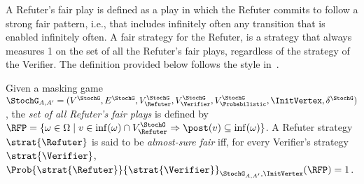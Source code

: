 



A Refuter's fair play is defined as a play in which the Refuter commits to follow a strong fair pattern, i.e., that includes infinitely often any transition that is enabled infinitely often.  A fair strategy for the Refuter, is a strategy that always measures 1 on the set of all the Refuter's fair plays, regardless of the strategy of the Verifier.  The definition provided below follows the style in~\cite{DBLP:journals/dc/BaierK98,BaierK08,DBLP:journals/corr/abs-2112-09811}.



%
\begin{definition}
  Given a masking game
  $\StochG_{A,A'} = (V^\StochG, E^\StochG, V^\StochG_\Refuter, V^\StochG_\Verifier, V^\StochG_\Probabilistic, \InitVertex, \delta^\StochG)$,
  the \emph{set of all Refuter's fair plays} is defined by
  $ 
	\RFP = \{ \omega \in \Omega \mid v \in \inf(\omega) \cap V^\StochG_\Refuter \Rightarrow \post(v) \subseteq \inf(\omega) \}
  $.
  A Refuter strategy $\strat{\Refuter}$ is said to
  be \emph{almost-sure fair} iff, for every Verifier's strategy
  $\strat{\Verifier}$,
  $\Prob{\strat{\Refuter}}{\strat{\Verifier}}_{\StochG_{A,A'},\InitVertex}(\RFP) = 1$.
\end{definition}


